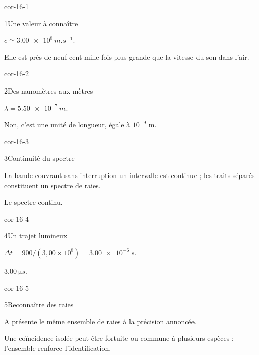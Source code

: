 \clearpage{}
\corrigesSouples
\begin{blocLivre}{cor-16-1}\begin{corrige}{1}{Une valeur à connaître}
\begin{questions}
\item $c\simeq\qty{3,00e8}{m.s^{-1}}$.
\item Elle est près de neuf cent mille fois plus grande que la vitesse du son dans l’air.
\end{questions}
\end{corrige}\end{blocLivre}
\begin{blocLivre}{cor-16-2}\begin{corrige}{2}{Des nanomètres aux mètres}
\begin{questions}
\item $\lambda=\qty{5,50e-7}{m}$.
\item Non, c’est une unité de longueur, égale à $10^{-9}$ m.
\end{questions}
\end{corrige}\end{blocLivre}
\begin{blocLivre}{cor-16-3}\begin{corrige}{3}{Continuité du spectre}
\begin{questions}
\item La bande couvrant sans interruption un intervalle est continue ; les traits séparés constituent un spectre de raies.
\item Le spectre continu.
\end{questions}
\end{corrige}\end{blocLivre}
\begin{blocLivre}{cor-16-4}\begin{corrige}{4}{Un trajet lumineux}
\begin{questions}
\item $\Delta t=900/(3,00\times10^8)=\qty{3,00e-6}{s}$.
\item $\qty{3,00}{\micro s}$.
\end{questions}
\end{corrige}\end{blocLivre}
\begin{blocLivre}{cor-16-5}\begin{corrige}{5}{Reconnaître des raies}
\begin{questions}
\item A présente le même ensemble de raies à la précision annoncée.
\item Une coïncidence isolée peut être fortuite ou commune à plusieurs espèces ; l’ensemble renforce l’identification.
\end{questions}
\end{corrige}\end{blocLivre}
